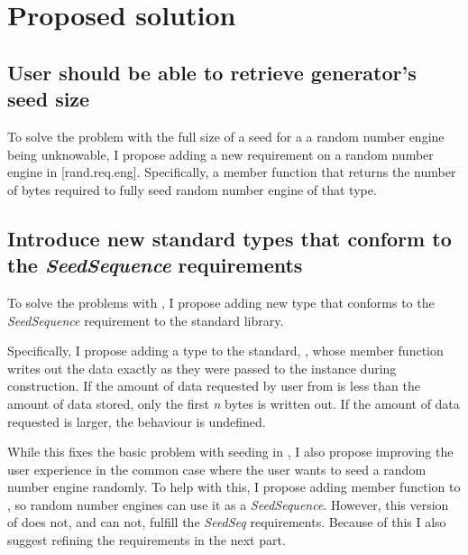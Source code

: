 \documentclass{wg21}
\begin{document}
\hypertarget{proposed-solution}{%
    \section{Proposed solution}\label{proposed-solution}}

\hypertarget{solution-1-give-randomness-size}{%
    \subsection{User should be able to retrieve generator's seed size}
\label{solution-1-give-randomness-size}}

To solve the problem with the full size of a seed for a a random number
engine being unknowable, I propose adding a new requirement on a random
number engine in [rand.req.eng]. Specifically, a member function
 that returns the
number of bytes required to fully seed random number engine of that
type.


\hypertarget{solution-2-add-std-sequences}{%
    \subsection{Introduce new standard types that conform to the \emph{SeedSequence} requirements}
    \label{solution-2-add-std-sequences}}

To solve the problems with , I propose adding new
type that conforms to the \emph{SeedSequence} requirement to the
standard library.

Specifically, I propose adding a type to the standard,
, whose  member function writes
out the data exactly as they were passed to the instance during
construction. If the amount of data requested by user from
 is less than the amount of data stored, only the first
\emph{n} bytes is written out. If the amount of data requested is larger,
the behaviour is undefined.

While this fixes the basic problem with seeding in ,
I also propose improving the user experience in the common case where
the user wants to seed a random number engine randomly. To help with
this, I propose adding  member function to
, so random number engines can use it as a
\emph{SeedSequence}. However, this version of 
does not, and can not, fulfill the \emph{SeedSeq} requirements. Because
of this I also suggest refining the requirements in the next part.
\end{document}
